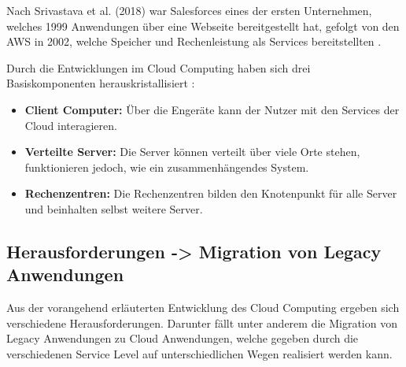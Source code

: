 Nach Srivastava et al. (2018) war Salesforces eines der ersten Unternehmen, welches 1999 Anwendungen über eine Webseite bereitgestellt hat,
gefolgt von den \ac{AWS} in 2002, welche Speicher und Rechenleistung als Services bereitstellten \cite[Vgl.][S. 17f]{Srivastava2018}.

Durch die Entwicklungen im Cloud Computing haben sich drei Basiskomponenten herauskristallisiert \cite[Vgl. auch im Folgenden][S. 18]{Srivastava2018}:
\begin{itemize}
\item \textbf{Client Computer:} Über die Engeräte kann der Nutzer mit den Services der Cloud interagieren.
\item \textbf{Verteilte Server:} Die Server können verteilt über viele Orte stehen, funktionieren jedoch, wie ein zusammenhängendes System.
\item \textbf{Rechenzentren:} Die Rechenzentren bilden den Knotenpunkt für alle Server und beinhalten selbst weitere Server.
\end{itemize}

\pagebreak

\subsection{Herausforderungen -> Migration von Legacy Anwendungen}

Aus der vorangehend erläuterten Entwicklung des Cloud Computing ergeben sich verschiedene Herausforderungen.
Darunter fällt unter anderem die Migration von Legacy Anwendungen zu Cloud Anwendungen, welche gegeben durch die verschiedenen Service Level
auf unterschiedlichen Wegen realisiert werden kann.